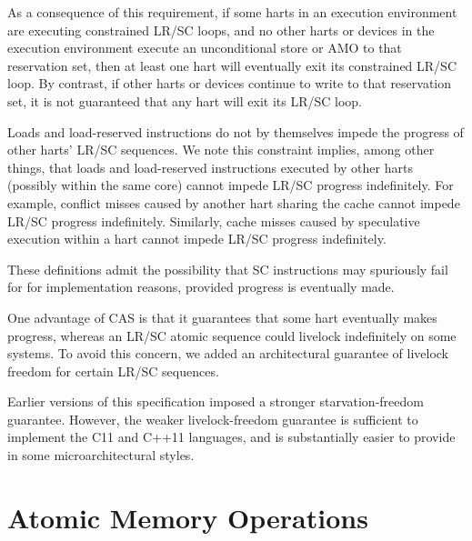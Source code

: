 \begin{commentary}
As a consequence of this requirement, if some harts in an execution
environment are executing constrained LR/SC loops, and no other harts or
devices in the execution environment execute an unconditional store or AMO to
that reservation set, then at least one hart will eventually exit its
constrained LR/SC loop.
By contrast, if other harts or devices continue to write to that reservation
set, it is not guaranteed that any hart will exit its LR/SC loop.

Loads and load-reserved instructions do not by themselves impede the progress
of other harts' LR/SC sequences.
We note this constraint implies, among other things, that loads and
load-reserved instructions executed by other harts (possibly within the same
core) cannot impede LR/SC progress indefinitely.
For example, conflict misses caused by another hart sharing the cache cannot
impede LR/SC progress indefinitely.
Similarly, cache misses caused by speculative execution within a hart cannot
impede LR/SC progress indefinitely.

These definitions admit the possibility that SC instructions may spuriously
fail for for implementation reasons, provided progress is eventually made.
\end{commentary}

\begin{commentary}
One advantage of CAS is that it guarantees that some hart eventually
makes progress, whereas an LR/SC atomic sequence could livelock
indefinitely on some systems.  To avoid this concern, we added an
architectural guarantee of livelock freedom for certain LR/SC sequences.

Earlier versions of this specification imposed a stronger starvation-freedom
guarantee.  However, the weaker livelock-freedom guarantee is sufficient to
implement the C11 and C++11 languages, and is substantially easier to provide
in some microarchitectural styles.
\end{commentary}

\section{Atomic Memory Operations}
\label{sec:amo}

